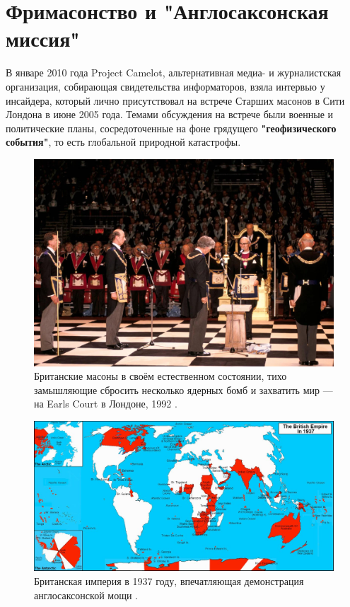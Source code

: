 \documentclass[10pt,twocolumn,letterpaper]{article}
\begin{document}
\section{Фримасонство и "Англосаксонская миссия"}

В январе 2010 года Project Camelot, альтернативная медиа- и журналистская организация, собирающая свидетельства информаторов, взяла интервью \cite{4,6} у инсайдера, который лично присутствовал на встрече Старших масонов в Сити Лондона в июне 2005 года. Темами обсуждения на встрече были военные и политические планы, сосредоточенные на фоне грядущего \textbf{"геофизического события"}, то есть глобальной природной катастрофы.

\begin{figure}[b]
\begin{center}
   \includegraphics[width=1\linewidth]{freemason.jpg}
\end{center}
   \caption{Британские масоны в своём естественном состоянии, тихо замышляющие сбросить несколько ядерных бомб и захватить мир — на Earls Court в Лондоне, 1992 \cite{5}.}
\label{fig:1}
\label{fig:onecol}
\end{figure}

\begin{figure}[t]
\begin{center}
\includegraphics[width=1\textwidth]{british.jpg}
\end{center}
   \caption{Британская империя в 1937 году, впечатляющая демонстрация англосаксонской мощи \cite{14}.}
   \label{fig:2}
\end{figure}
\end{document}
